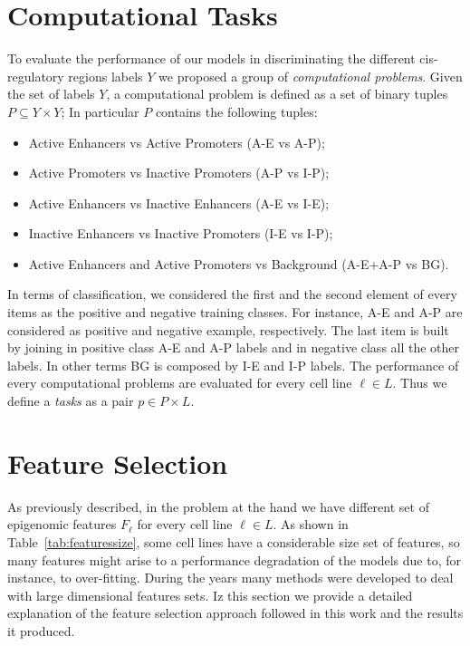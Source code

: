 \section{Computational Tasks} \label{sec:computational_tasks}
To evaluate the performance of our models in discriminating the different cis-regulatory regions labels $Y$ we proposed a group of \emph{computational problems}. Given the set of labels $Y$, a computational problem is defined as a set of binary tuples $P \subseteq Y \times Y$; In particular $P$ contains the following tuples: 
\begin{itemize}
    \item Active Enhancers vs Active Promoters (A-E vs A-P);
    \item Active Promoters vs Inactive Promoters (A-P vs I-P);
    \item Active Enhancers vs Inactive Enhancers (A-E vs I-E); 
    \item Inactive Enhancers vs Inactive Promoters (I-E vs I-P); 
    \item Active Enhancers and Active Promoters vs Background (A-E+A-P vs BG).
\end{itemize}
In terms of classification, we considered the first and the second element of every items as the positive and negative training classes. For instance, A-E and A-P are considered as positive and negative example, respectively. The last item is built by joining in positive class A-E and A-P labels and in negative class all the other labels. In other terms BG is composed by I-E and I-P labels. The performance of every computational problems are evaluated for every cell line $\ell \in L$. Thus we define a \emph{tasks} as a pair $p \in P \times L$. 

\section{Feature Selection} \label{sec:featureselection}
As previously described, in the problem at the hand we have different set of epigenomic features $F_\ell$ for every cell line $\ell \in L$. As shown in Table~\ref{tab:featuressize}, some cell lines have a considerable size set of features, so many features might arise to a performance degradation of the models due to, for instance, to over-fitting. During the years many methods were developed to deal with large dimensional features sets. Iz this section we provide a detailed explanation of the feature selection approach followed in this work and the results it produced. 

